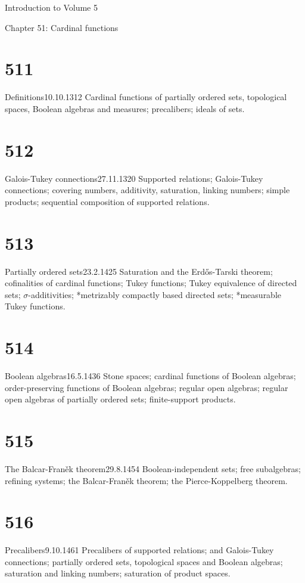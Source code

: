 
Introduction to Volume 5 


 Chapter 51:  Cardinal functions


\section{511}{Definitions}{10.10.13}{}{12}
{Cardinal functions of partially ordered sets, topological spaces,
Boolean algebras and measures;  precalibers;  ideals of sets.}

\section{512}{Galois-Tukey connections}{27.11.13}{}{20}
{Supported relations;  Galois-Tukey connections;
covering numbers, additivity, saturation,
linking numbers;  simple products;
sequential composition of supported relations.}

\section{513}{Partially ordered sets}{23.2.14}{}{25}
{Saturation and the Erd\H{o}s-Tarski theorem;
cofinalities of cardinal functions;  Tukey functions;
Tukey equivalence of directed sets;  $\sigma$-additivities;
*metrizably compactly based directed sets;  *measurable Tukey functions.}

\section{514}{Boolean algebras}{16.5.14}{}{36}
{Stone spaces;  cardinal
functions of Boolean algebras;  order-preserving functions of Boolean
algebras;  regular open algebras;   regular open
algebras of partially ordered sets;  finite-support products.}

\section{515}{The Balcar-Fran\v{e}k theorem}{29.8.14}{}{54}
{Boolean-independent sets;  free subalgebras;  refining systems;  the
Balcar-Fran\v{e}k theorem;  the Pierce-Koppelberg theorem.}

\section{516}{Precalibers}{9.10.14}{}{61}
{Precalibers of supported relations;  and Galois-Tukey connections;
partially ordered sets, topological spaces and Boolean algebras;
saturation and linking numbers;  saturation of product spaces.}

